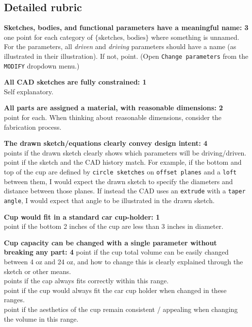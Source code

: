 \documentclass[11pt]{article}
\begin{document}
\subsection*{Detailed rubric}
\textbf{Sketches, bodies, and functional parameters have a meaningful name: 3}
\\
\Dock one point for each category of $\{\text{sketches, bodies}\}$ where something is unnamed.
For the parameters, all \emph{driven} and \emph{driving} parameters should have a name (as illustrated in their illustration). If not,  point. (Open \texttt{Change parameters} from the \texttt{MODIFY} dropdown menu.)
\par
\textbf{All CAD sketches are fully constrained: 1}
\\
Self explanatory.
\par
\textbf{All parts are assigned a material, with reasonable dimensions: 2}
\\
 point for each. When thinking about reasonable dimensions, consider the fabrication process.
\par
\textbf{The drawn sketch/equations clearly convey design intent: 4}
\\
 points if the drawn sketch clearly shows which parameters will be driving/driven.\\
 point if the sketch and the CAD history match. For example, if the bottom and top of the cup are defined by \texttt{circle sketches} on \texttt{offset planes} and a \texttt{loft} between them, I would expect the drawn sketch to specify the diameters and distance between those planes. If instead the CAD uses an \texttt{extrude} with a \texttt{taper angle}, I would expect that angle to be illustrated in the drawn sketch.
\par
\textbf{Cup would fit in a standard car cup-holder: 1}
\\
 point if the bottom 2 inches of the cup are less than 3 inches in diameter.
\par
\textbf{Cup capacity can be changed with a single parameter without breaking any part: 4}
 point if the cup total volume can be easily changed between 4 oz and 24 oz, and how to change this is clearly explained through the sketch or other means.
\\
 points if the cap always fits correctly within this range.
\\
 point if the cup would always fit the car cup holder when changed in these ranges.
\\
 point if the aesthetics of the cup remain consistent / appealing when changing the volume in this range.
\\
\end{document}
